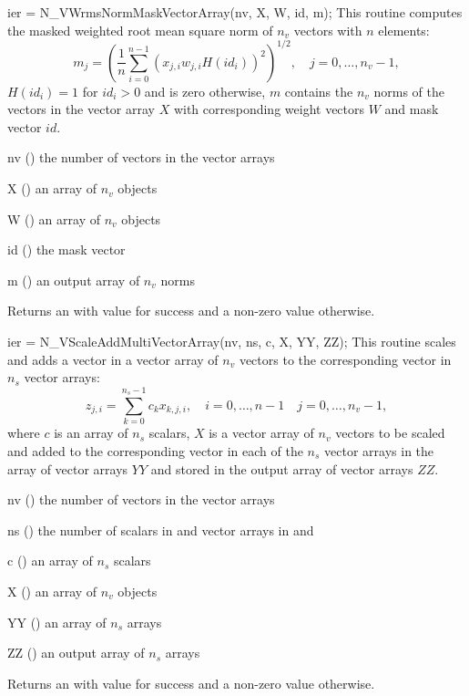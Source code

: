 {
  ier = N\_VWrmsNormMaskVectorArray(nv, X, W, id, m);
}
{
  This routine computes the masked weighted root mean square norm of $n_v$
  vectors with $n$ elements:
  \begin{equation*}
    m_j = \left( \frac1n \sum_{i=0}^{n-1} \left(x_{j,i} w_{j,i}
    H(id_i)\right)^2 \right)^{1/2}, \quad j=0,\ldots,n_v-1,
  \end{equation*}
  $H(id_i)=1$ for $id_i > 0$ and is zero otherwise, $m$ contains the $n_v$
  norms of the vectors in the vector array $X$ with corresponding weight
  vectors $W$ and mask vector $id$.
}
{
  \begin{args}[nv]
  \item[nv] () the number of vectors in the vector arrays
  \item[X] () an array of $n_v$ {\nvector} objects
  \item[W] () an array of $n_v$ {\nvector} objects
  \item[id] () the mask vector 
  \item[m] () an output array of $n_v$ norms
  \end{args}
}
{
  Returns an  with value  for success and a non-zero value otherwise.
}
{}

{
  ier = N\_VScaleAddMultiVectorArray(nv, ns, c, X, YY, ZZ);
}
{
  This routine scales and adds a vector in a vector array of $n_v$ vectors to
  the corresponding vector in $n_s$ vector arrays:
  \begin{equation*}
    z_{j,i} = \sum_{k=0}^{n_s-1} c_k x_{k,j,i}, \quad i=0,\ldots,n-1 \quad j=0,\ldots,n_v-1,
  \end{equation*}
  where $c$ is an array of $n_s$ scalars, $X$ is a vector array of $n_v$ vectors
  to be scaled and added to the corresponding vector in each of the $n_s$ vector
  arrays in the array of vector arrays $YY$ and stored in the output array of vector
  arrays $ZZ$.
}
{
  \begin{args}[nv]
  \item[nv] () the number of vectors in the vector arrays
  \item[ns] () the number of scalars in  and vector arrays
    in  and 
  \item[c] () an array of $n_s$ scalars
  \item[X] () an array of $n_v$ {\nvector} objects
  \item[YY] () an array of $n_s$ {\nvector} arrays
  \item[ZZ] () an output array of $n_s$ {\nvector}
    arrays
  \end{args}
}
{
  Returns an  with value  for success and a non-zero value otherwise.
}
{}

